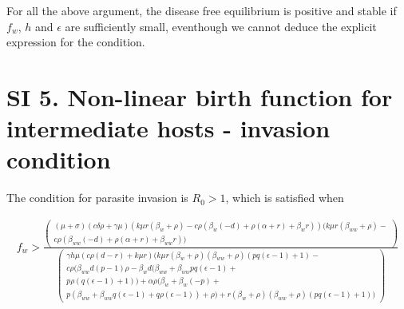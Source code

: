 \documentclass[11pt]{article}
\begin{document}
For all the above argument, the disease free equilibrium is positive and stable if $f_w$, $h$ and $\epsilon$ are sufficiently small, eventhough we cannot deduce the explicit expression for the condition.

\section*{SI 5. Non-linear birth function for intermediate hosts - invasion condition}

The condition for parasite invasion is $R_0 > 1$, which is satisfied when


\begin{align}
	f_w > \frac{\begin{pmatrix}
			(\mu +\sigma ) (c \delta  \rho +\gamma  \mu ) (k \mu  r (\beta_w+\rho )-c \rho  (\beta_w (-d)+\rho  (\alpha +r)+\beta_w r)) (k \mu  r (\beta_{ww}+\rho )- \\
			c \rho  (\beta_{ww} (-d)+\rho  (\alpha +r)+\beta_{ww} r))
		\end{pmatrix}}{\begin{pmatrix}
		\gamma  h \mu  (c \rho  (d-r)+k \mu  r) (k \mu  r (\beta_w+\rho ) (\beta_{ww}+\rho ) (p q (\epsilon -1)+1) - \\ 
		c \rho  (\beta_{ww} d (p-1) \rho -\beta_w d (\beta_{ww} + \beta_{ww} p q (\epsilon -1) + \\
		p \rho  (q (\epsilon -1)+1))+\alpha  \rho  (\beta_w+\beta_w (-p)+ \\ 
		p (\beta_{ww}+\beta_{ww} q (\epsilon -1)+q \rho  (\epsilon -1))+\rho )+r (\beta_w+\rho ) (\beta_{ww}+\rho ) (p q (\epsilon -1)+1))
	\end{pmatrix}}
\end{align}
\end{document}
